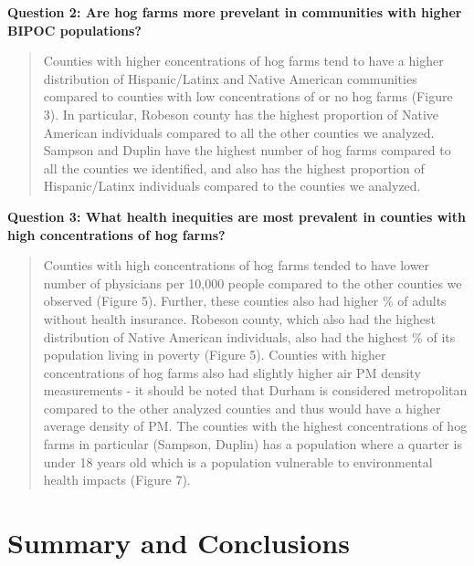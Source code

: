 \documentclass[
  12pt,
]{article}
\begin{document}
\textbf{Question 2: Are hog farms more prevelant in communities with
higher BIPOC populations?}

\begin{quote}
Counties with higher concentrations of hog farms tend to have a higher
distribution of Hispanic/Latinx and Native American communities compared
to counties with low concentrations of or no hog farms (Figure 3). In
particular, Robeson county has the highest proportion of Native American
individuals compared to all the other counties we analyzed. Sampson and
Duplin have the highest number of hog farms compared to all the counties
we identified, and also has the highest proportion of Hispanic/Latinx
individuals compared to the counties we analyzed.
\end{quote}

\textbf{Question 3: What health inequities are most prevalent in
counties with high concentrations of hog farms?}

\begin{quote}
Counties with high concentrations of hog farms tended to have lower
number of physicians per 10,000 people compared to the other counties we
observed (Figure 5). Further, these counties also had higher \% of
adults without health insurance. Robeson county, which also had the
highest distribution of Native American individuals, also had the
highest \% of its population living in poverty (Figure 5). Counties with
higher concentrations of hog farms also had slightly higher air PM
density measurements - it should be noted that Durham is considered
metropolitan compared to the other analyzed counties and thus would have
a higher average density of PM. The counties with the highest
concentrations of hog farms in particular (Sampson, Duplin) has a
population where a quarter is under 18 years old which is a population
vulnerable to environmental health impacts (Figure 7).
\end{quote}

\newpage

\hypertarget{summary-and-conclusions}{%
\section{Summary and Conclusions}\label{summary-and-conclusions}}
\end{document}
